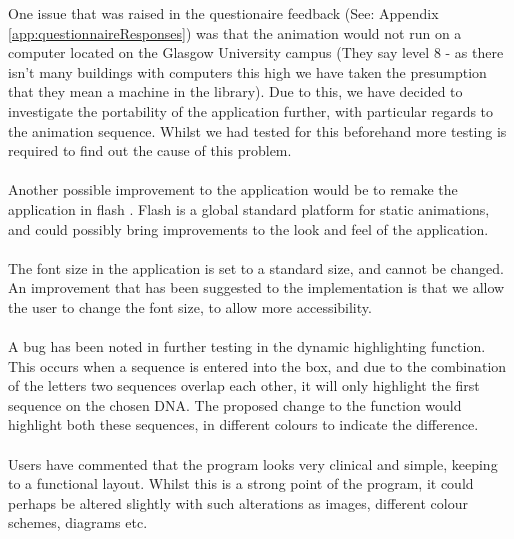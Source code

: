 One issue that was raised in the questionaire feedback (See: Appendix \ref{app:questionnaireResponses}) was that the animation would not run on a computer located on the Glasgow University campus (They say level 8 - as there isn't many buildings with computers this high we have taken the presumption that they mean a machine in the library). Due to this, we have decided to investigate the portability of the application further, with particular regards to the animation sequence. Whilst we had tested for this beforehand more testing is required to find out the cause of this problem. \\ \\

Another possible improvement to the application would be to remake the application in flash \cite{Flash}. Flash is a global standard platform for static animations, and could possibly bring improvements to the look and feel of the application. \\ \\

The font size in the application is set to a standard size, and cannot be changed. An improvement that has been suggested to the implementation is that we allow the user to change the font size, to allow more accessibility. \\ \\

A bug has been noted in further testing in the dynamic highlighting function. This occurs when a sequence is entered into the box, and due to the combination of the letters two sequences overlap each other, it will only highlight the first sequence on the chosen DNA. The proposed change to the function would highlight both these sequences, in different colours to indicate the difference. \\ \\

Users have commented that the program looks very clinical and simple, keeping to a functional layout. Whilst this is a strong point of the program, it could perhaps be altered slightly with such alterations as images, different colour schemes, diagrams etc. \\ \\












